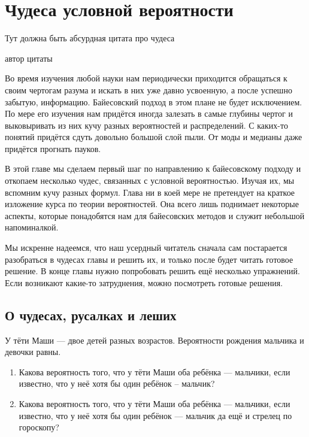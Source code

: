 
\chapter{ Чудеса условной вероятности }

\epigraph{Тут должна быть абсурдная цитата про чудеса}{автор цитаты }



Во время изучения любой науки нам периодически приходится обращаться к своим чертогам разума и искать в них уже давно усвоенную, а после успешно забытую, информацию. Байесовский подход в этом плане не будет исключением. По мере его изучения нам придётся иногда залезать в самые глубины чертог и выковыривать из них кучу разных вероятностей и распределений. С каких-то понятий придётся сдуть довольно большой слой пыли. От моды и медианы даже придётся прогнать пауков. 

В этой главе мы сделаем первый шаг по направлению к байесовскому подходу и откопаем несколько чудес, связанных с условной вероятностью.  Изучая их, мы вспомним кучу разных формул. Глава ни в коей мере не претендует на краткое изложение курса по теории вероятностей. Она всего лишь поднимает некоторые аспекты, которые понадобятся нам для байесовских методов и служит небольшой напоминалкой. 

Мы искренне надеемся, что наш усердный читатель сначала сам постарается разобраться в чудесах главы и решить их, и только после будет читать готовое решение.  В конце главы нужно попробовать решить ещё несколько упражнений. Если возникают какие-то затруднения, можно посмотреть готовые решения. 

\section{О чудесах, русалках и леших}

\begin{chudo}
У тёти Маши --- двое детей разных возрастов. Вероятности рождения мальчика и девочки равны.

\begin{enumerate}
\item Какова вероятность того, что у тёти Маши оба ребёнка --- мальчики, если известно, что у неё хотя бы один ребёнок -- мальчик?
\item Какова вероятность того, что у тёти Маши оба ребёнка --- мальчики, если известно, что у неё хотя бы один ребёнок --- мальчик да ещё и стрелец по гороскопу?
\end{enumerate}
\end{chudo}

